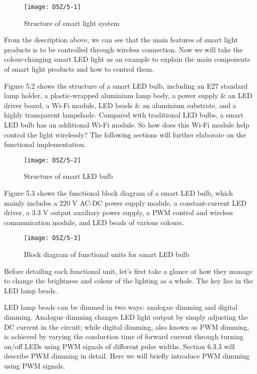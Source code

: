 \documentclass[a4paper,12pt]{book}
\begin{document}
\begin{figure}[h!]
    \centering
    \texttt{[image: D5Z/5-1]}
    \caption{Structure of smart light system}
\end{figure}

From the description above, we can see that the main features of smart light products is to be controlled through wireless connection. Now we will take the colour-changing smart LED light as an example to explain the main components of smart light products and how to control them.

Figure 5.2 shows the structure of a smart LED bulb, including an E27 standard lamp holder, a plastic-wrapped aluminium lamp body, a power supply \& an LED driver board, a Wi-Fi module, LED beads \& an aluminium substrate, and a highly transparent lampshade. Compared with traditional LED bulbs, a smart LED bulb has an additional Wi-Fi module. So how does this Wi-Fi module help control the light wirelessly? The following sections will further elaborate on the functional implementation.

\begin{figure}[h!]
    \centering
    \texttt{[image: D5Z/5-2]}
    \caption{Structure of smart LED bulb}
\end{figure}

Figure 5.3 shows the functional block diagram of a smart LED bulb, which mainly includes a 220 V AC-DC power supply module, a constant-current LED driver, a 3.3 V output auxiliary power supply, a PWM control and wireless communication module, and LED beads of various colours.

\begin{figure}[h!]
    \centering
    \texttt{[image: D5Z/5-3]}
    \caption{Block diagram of functional units for smart LED bulb}
\end{figure}

Before detailing each functional unit, let’s first take a glance at how they manage to change the brightness and colour of the lighting as a whole. The key lies in the LED lamp beads.

LED lamp beads can be dimmed in two ways: analogue dimming and digital dimming. Analogue dimming changes LED light output by simply adjusting the DC current in the circuit; while digital dimming, also known as PWM dimming, is achieved by varying the conduction time of forward current through turning on/off LEDs using PWM signals of different pulse widths. Section 6.3.3 will describe PWM dimming in detail. Here we will briefly introduce PWM dimming using PWM signals.
\end{document}
